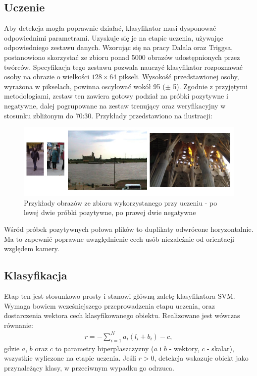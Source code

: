 \subsection{Uczenie}
Aby detekcja mogła poprawnie działać, klasyfikator musi dysponować odpowiednimi parametrami. Uzyskuje się je na etapie uczenia, używając odpowiedniego zestawu danych.
Wzorując się na pracy Dalala oraz Triggsa, postanowiono skorzystać ze zbioru ponad 5000 obrazów udostępnionych przez twórców. Specyfikacja tego zestawu pozwala nauczyć klasyfikator rozpoznawać osoby na obrazie o wielkości $128\times 64$ pikseli. Wysokość przedstawionej osoby, wyrażona w pikselach, powinna oscylować wokół 95 ($\pm$ 5). \newline
Zgodnie z przyjętymi metodologiami, zestaw ten zawiera gotowy podział na próbki pozytywne i negatywne, dalej pogrupowane na zestaw trenujący oraz weryfikacyjny w stosunku zbliżonym do 70:30. Przykłady przedstawiono na ilustracji:

\begin{figure}[h]
	\centering
	\captionsetup{justification=centering,margin=1cm}
	\hspace*{1cm}
	\includegraphics[width=14.5cm]{2_HOG_image_examples.jpg}
	\caption{Przykłady obrazów ze zbioru wykorzystanego przy uczeniu - po lewej dwie próbki pozytywne, po prawej dwie negatywne}
	\label{fig:HOG_image_examples}
\end{figure}
Wśród próbek pozytywnych połowa plików to duplikaty odwrócone horyzontalnie. Ma to zapewnić poprawne uwzględnienie cech usób niezależnie od orientacji względem kamery.

\subsection{Klasyfikacja}
\label{sec:klasyfikacja}
Etap ten jest stosunkowo prosty i stanowi główną zaletę klasyfikatora SVM. Wymaga bowiem wcześniejszego przeprowadzenia etapu uczenia, oraz dostarczenia wektora cech klasyfikowanego obiektu. Realizowane jest wówczas równanie:
\begin{equation}
\label{eq:HOG_classification}
\left.\begin{aligned} 
r=-\sum_{i=1}^{N}a_i(l_i+b_i)-c,
\end{aligned}\right.
\end{equation}
gdzie $a$, $b$ oraz $c$ to parametry hiperpłaszczyzny ($a$ i $b$ - wektory, $c$ - skalar), wszystkie wyliczone na etapie uczenia.
Jeśli $r>0$, detekcja wskazuje obiekt jako przynależący klasy, w przeciwnym wypadku go odrzuca.

